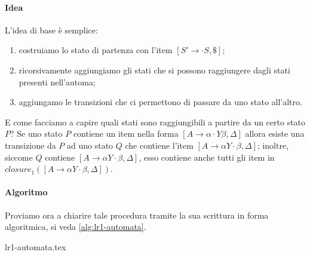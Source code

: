 \documentclass[class=book, crop=false, oneside, 12pt]{standalone}
\begin{document}
\paragraph{Idea}
L'idea di base è semplice:
\begin{enumerate}
    \item costruiamo lo stato di partenza con l'item \([S' \to \cdot S, {\$}]\);
    \item ricorsivamente aggiungiamo gli stati che si possono raggiungere dagli stati presenti nell'automa;
    \item aggiungamo le transizioni che ci permettono di passare da uno stato all'altro.
\end{enumerate}
E come facciamo a capire quali stati sono raggiungibili a partire da un certo stato \(P\)? Se uno stato \(P\) contiene un item nella forma \([A \to \alpha \cdot Y \beta, \Delta]\) allora esiste una transizione da \(P\) ad uno stato \(Q\) che contiene l'item \([A \to \alpha Y \cdot \beta , \Delta]\); inoltre, siccome \(Q\) contiene \([A \to \alpha Y \cdot \beta , \Delta]\), esso contiene anche tutti gli item in \(closure_1([A \to \alpha Y \cdot \beta , \Delta])\).

\paragraph{Algoritmo}
Proviamo ora a chiarire tale procedura tramite la sua scrittura in forma algoritmica, si veda \ref{alg:lr1-automata}.

{lr1-automata.tex}
\end{document}
